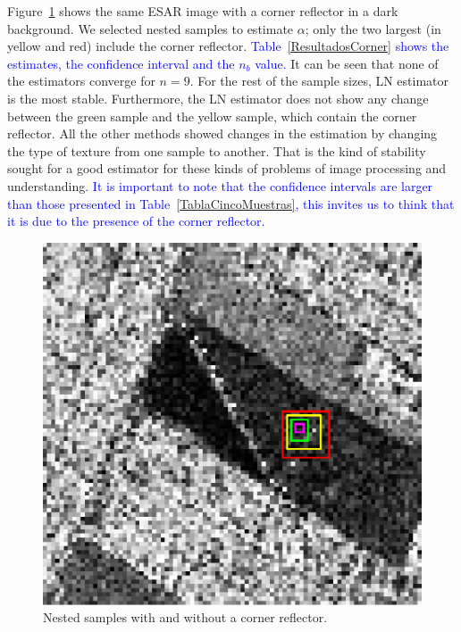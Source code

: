 \documentclass[twocolumn]{svjour3}
\begin{document}
Figure~\ref{CornerReflector} shows the same ESAR image with a corner reflector in a dark background. 
We selected nested samples to estimate $\alpha$; only the two largest (in yellow and red) include the corner reflector.
\textcolor{blue}{Table~\ref{ResultadosCorner} shows the estimates, the confidence interval and the $n_b$ value. }
It can be seen that none of the estimators converge for $n=9$. 
For the rest of the sample sizes, LN estimator is the most stable. 
Furthermore, the LN estimator does not show any change between the green sample and the yellow sample, which contain the corner reflector. 
All the other methods showed changes in the estimation by changing the type of texture from one sample to another. 
That is the kind of stability sought for a good estimator for these kinds of problems of image processing and understanding. \textcolor{blue}{It is important to note that the confidence intervals are larger than those presented in Table~\ref{TablaCincoMuestras}, this invites us to think that it is due to the presence of the corner reflector. }

\begin{figure}[hbt]
	\centering
	\includegraphics[width=\linewidth]{../../../Figures/PaperTesis/CornerJulia_Roja.eps}
	\caption{Nested samples with and without a corner reflector.}\label{CornerReflector}
\end{figure}
\end{document}
